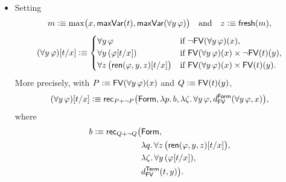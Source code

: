 \begin{defn}[Substitution]
\begin{itemize}
        \item Setting
        \[
            m\mathrel{\vcentcolon}\equiv\max\bigl(
                x,
                \mathsf{maxVar}(t),
                \mathsf{maxVar}(\forall y\,\varphi)
            \bigr)
            \quad\text{and}\quad
            z\mathrel{\vcentcolon}\equiv\mathsf{fresh}(m),
        \]
        \[
            (\forall y\,\varphi)[t/x]\mathrel{\vcentcolon}\equiv
            \begin{cases}
                \forall y\,\varphi
                    &\text{if }\neg\mathsf{FV}(
                        \forall y\,\varphi
                    )(x),\\
                \forall y\,(\varphi[t/x])
                    &\text{if }\mathsf{FV}(
                        \forall y\,\varphi
                    )(x)
                    \times
                    \neg\mathsf{FV}(t)(y),\\
                \forall z\,\bigl(
                    \mathsf{ren}(\varphi,y,z)[t/x]
                \bigr)
                    &\text{if }\mathsf{FV}(
                        \forall y\,\varphi
                    )(x)
                    \times\mathsf{FV}(t)(y).
            \end{cases}
        \]
        More precisely, with $P\mathrel{\vcentcolon}\equiv\mathsf{FV}(\forall y\,\varphi)(x)$ and $Q\mathrel{\vcentcolon}\equiv\mathsf{FV}(t)(y)$,
        \[
            (\forall y\,\varphi)[t/x]
            \mathrel{\vcentcolon}\equiv
            \mathsf{rec}_{P+\neg P}\bigl(
                \mathsf{Form},
                \lambda p.\,b,
                \lambda\zeta.\,\forall y\,\varphi,
                d_{\mathsf{FV}}^{\mathsf{Form}}(
                    \forall y\,\varphi,x
                )
            \bigr),
        \]
        where
        \begin{align*}
            b\mathrel{\vcentcolon}\equiv\mathsf{rec}_{Q+\neg Q}\bigl(
                &\mathsf{Form},\\
                &\lambda q.\,\forall z\,\bigl(
                    \mathsf{ren}(\varphi,y,z)[t/x]
                \bigr),\\
                &\lambda\zeta.\,\forall y\,(
                    \varphi[t/x]
                ),\\
                &d_{\mathsf{FV}}^{\mathsf{Term}}(t,y)
            \bigr).
        \end{align*}
    \end{itemize}
\end{defn}        


